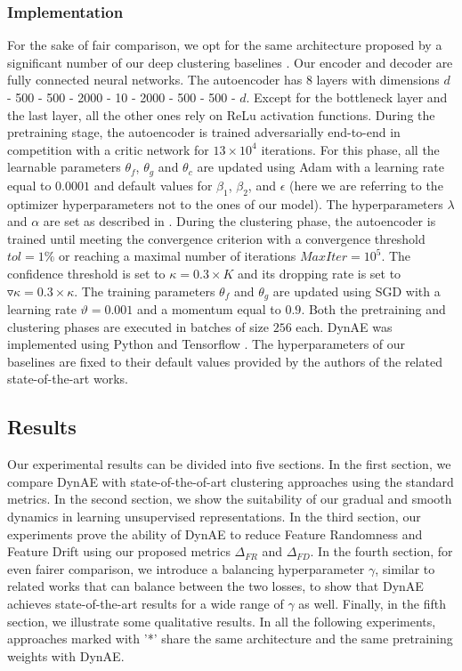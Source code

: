 \documentclass{article}
\begin{document}
\subsubsection{Implementation}
For the sake of fair comparison, we opt for the same architecture proposed by a significant number of our deep clustering baselines \cite{paper27, paper28, paper35, paper29}. Our encoder and decoder are fully connected neural networks. The autoencoder has 8 layers with dimensions $d$ - 500 - 500 - 2000 - 10 - 2000 - 500 - 500 - $d$. Except for the bottleneck layer and the last layer, all the other ones rely on ReLu \cite{paper44} activation functions. During the pretraining stage, the autoencoder is trained adversarially end-to-end in competition with a critic network for $13 \times 10^{4}$ iterations. For this phase, all the learnable parameters $\theta_{f}$, $\theta_{g}$ and $\theta_{c}$ are updated using Adam \cite{paper45} with a learning rate equal to $0.0001$ and default values for $\beta_{1}$, $\beta_{2}$, and $\epsilon$ (here we are referring to the optimizer hyperparameters not to the ones of our model). The hyperparameters $\lambda$ and $\alpha$ are set as described in \cite{paper5}. During the clustering phase, the autoencoder is trained until meeting the convergence criterion with a convergence threshold $tol = 1\%$ or reaching a maximal number of iterations $MaxIter = 10^{5}$. The confidence threshold is set to $\kappa = 0.3 \times K$ and its dropping rate is set to $\triangledown \kappa = 0.3 \times \kappa$. The training parameters $\theta_{f}$ and $\theta_{g}$ are updated using SGD with a learning rate $\vartheta = 0.001$ and a momentum equal to $0.9$. Both the pretraining and clustering phases are executed in batches of size $256$ each. DynAE was implemented using Python and Tensorflow \cite{paper46}. The hyperparameters of our baselines are fixed to their default values provided by the authors of the related state-of-the-art works.

\subsection{Results}
Our experimental results can be divided into five sections. In the first section, we compare DynAE with state-of-the-of-art clustering approaches using the standard metrics. In the second section, we show the suitability of our gradual and smooth dynamics in learning unsupervised representations. In the third section, our experiments prove the ability of DynAE to reduce Feature Randomness and Feature Drift using our proposed metrics $\Delta_{FR}$ and $\Delta_{FD}$. In the fourth section, for even fairer comparison, we introduce a balancing hyperparameter $\gamma$, similar to related works \cite{paper27, paper28, paper29, paper36} that can balance between the two losses, to show that DynAE achieves state-of-the-art results for a wide range of $\gamma$ as well. Finally, in the fifth section, we illustrate some qualitative results. In all the following experiments, approaches marked with '*' share the same architecture and the same pretraining weights with DynAE.
\end{document}

